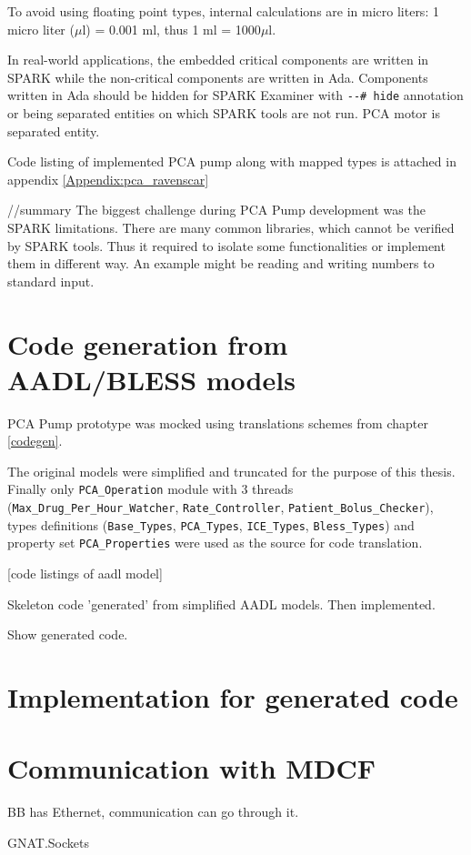 To avoid using floating point types, internal calculations are in micro liters: 1 micro liter ($\mu$l) = 0.001 ml, thus 1 ml = 1000$\mu$l.

In real-world applications, the embedded critical components are written in SPARK while the non-critical components are written in Ada. Components written in Ada should be hidden for SPARK Examiner with \lstinline{--# hide} annotation or being separated entities on which SPARK tools are not run. PCA motor is separated entity.

Code listing of implemented PCA pump along with mapped types is attached in appendix \ref{Appendix:pca_ravenscar}

//summary
The biggest challenge during PCA Pump development was the SPARK limitations. There are many common libraries, which cannot be verified by SPARK tools. Thus it required to isolate some functionalities or implement them in different way. An example might be reading and writing numbers to standard input.



\section{Code generation from AADL/BLESS models}
\label{pcapumpimpl:codegen}

PCA Pump prototype was mocked using translations schemes from chapter \ref{codegen}.

The original models were simplified and truncated for the purpose of this thesis. Finally only \lstinline{PCA_Operation} module with 3 threads (\lstinline{Max_Drug_Per_Hour_Watcher}, \lstinline{Rate_Controller}, \lstinline{Patient_Bolus_Checker}), types definitions (\lstinline{Base_Types}, \lstinline{PCA_Types}, \lstinline{ICE_Types}, \lstinline{Bless_Types}) and property set \lstinline{PCA_Properties} were used as the source for code translation.

[code listings of aadl model]


Skeleton code 'generated' from simplified AADL models. Then implemented.

Show generated code.



\section{Implementation for generated code}
\label{pcapumpimpl:codegenimpl}




\section{Communication with MDCF}
\label{pcapumpimpl:mdcf}

BB has Ethernet, communication can go through it.

GNAT.Sockets


